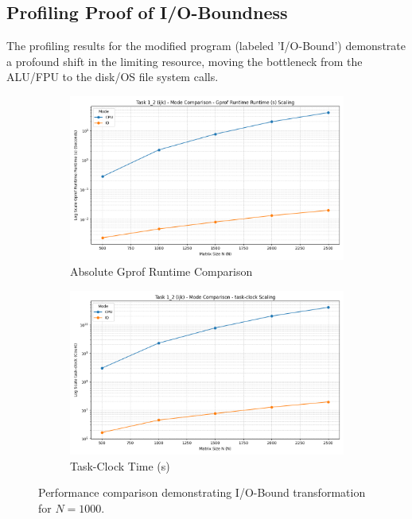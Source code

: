 \documentclass[11pt, a4paper]{article}
\begin{document}
\subsection{Profiling Proof of I/O-Boundness}

The profiling results for the modified program (labeled 'I/O-Bound') demonstrate a profound shift in the limiting resource, moving the bottleneck from the ALU/FPU to the disk/OS file system calls.

\begin{figure}[h] %
    \centering
    \begin{subfigure}[b]{0.48\textwidth}
        \centering
        \includegraphics[width=\textwidth]{plots/task_1_2_(ijk)_-_mode_comparison_-__gprof_runtime.png}
        \caption{Absolute Gprof Runtime Comparison}
        \label{fig:t2_gprof_abs}
    \end{subfigure}
    \hfill
    \begin{subfigure}[b]{0.48\textwidth}
        \centering
        \includegraphics[width=\textwidth]{plots/task_1_2_(ijk)_-_mode_comparison_-__task-clock.png}
        \caption{Task-Clock Time (s)}
        \label{fig:t2_task_clock}
    \end{subfigure}
    \caption{Performance comparison demonstrating I/O-Bound transformation for $N=1000$.}
\end{figure}
\end{document}
